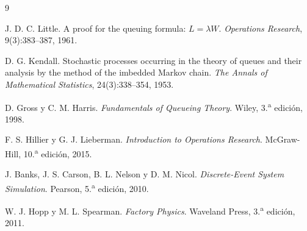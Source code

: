 \begin{thebibliography}{9}

J. D. C. Little.
\newblock A proof for the queuing formula: $L=\lambda W$.
\newblock \emph{Operations Research}, 9(3):383--387, 1961.

D. G. Kendall.
\newblock Stochastic processes occurring in the theory of queues and their
analysis by the method of the imbedded Markov chain.
\newblock \emph{The Annals of Mathematical Statistics}, 24(3):338--354, 1953.

D. Gross y C. M. Harris.
\newblock \emph{Fundamentals of Queueing Theory}.
\newblock Wiley, 3.\textsuperscript{a} edición, 1998.

F. S. Hillier y G. J. Lieberman.
\newblock \emph{Introduction to Operations Research}.
\newblock McGraw-Hill, 10.\textsuperscript{a} edición, 2015.

J. Banks, J. S. Carson, B. L. Nelson y D. M. Nicol.
\newblock \emph{Discrete-Event System Simulation}.
\newblock Pearson, 5.\textsuperscript{a} edición, 2010.

W. J. Hopp y M. L. Spearman.
\newblock \emph{Factory Physics}.
\newblock Waveland Press, 3.\textsuperscript{a} edición, 2011.

\end{thebibliography}
